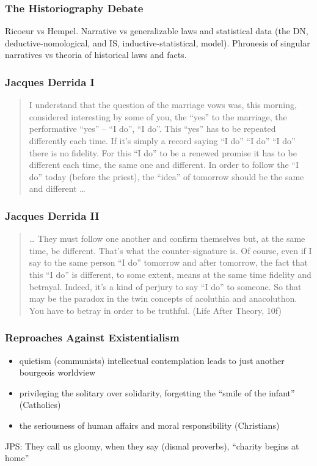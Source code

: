 \documentclass[xcolor=dvipsnames]{beamer}
\begin{document}
\begin{frame}
  \frametitle{The Historiography Debate}
  Ricoeur vs Hempel. Narrative vs generalizable laws and statistical
  data (the DN, deductive-nomological, and IS, inductive-statistical,
  model). Phronesis of singular narratives vs theoria of historical
  laws and facts.
\end{frame}

\begin{frame}
  \frametitle{Jacques Derrida I}
  \begin{quote}
    I understand that the question of the marriage vows was, this
    morning, considered interesting by some of you, the ``yes'' to the
    marriage, the performative ``yes'' -- ``I do'', ``I do''. This
    ``yes'' has to be repeated differently each time. If it's simply a
    record saying ``I do'' ``I do'' ``I do'' there is no fidelity. For
    this ``I do'' to be a renewed promise it has to be different each
    time, the same one and different. In order to follow the ``I do''
    today (before the priest), the ``idea'' of tomorrow should be the
    same and different {\ldots}
  \end{quote}
\end{frame}

\begin{frame}
  \frametitle{Jacques Derrida II}
  \begin{quote}
    {\ldots} They must follow one another and confirm themselves but,
    at the same time, be different. That's what the counter-signature
    is. Of course, even if I say to the same person ``I do'' tomorrow
    and after tomorrow, the fact that this ``I do'' is different, to
    some extent, means at the same time fidelity and betrayal. Indeed,
    it's a kind of perjury to say ``I do'' to someone. So that may be
    the paradox in the twin concepts of acoluthia and anacoluthon. You
    have to betray in order to be truthful. (Life After Theory, 10f)
  \end{quote}
\end{frame}

\begin{frame}
  \frametitle{Reproaches Against Existentialism}
  \begin{itemize}
  \item quietism (communists) intellectual contemplation leads to just
    another bourgeois worldview
  \item privileging the solitary over solidarity, forgetting the
    ``smile of the infant'' (Catholics)
  \item the seriousness of human affairs and moral responsibility (Christians)
  \end{itemize}
  JPS: They call us gloomy, when they say (dismal proverbs), ``charity
  begins at home''
\end{frame}
\end{document}
